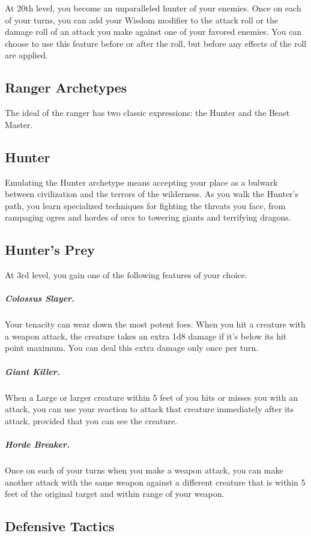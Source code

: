 At 20th level, you become an unparalleled hunter of your enemies. Once on each of your turns, you can add your Wisdom modifier to the attack roll or the damage roll of an attack you make against one of your favored enemies. You can choose to use this feature before or after the roll, but before any effects of the roll are applied.

\subsection{Ranger Archetypes}

The ideal of the ranger has two classic expressions: the Hunter and the Beast Master.

\subsection{Hunter}

Emulating the Hunter archetype means accepting your place as a bulwark between civilization and the terrors of the wilderness. As you walk the Hunter’s path, you learn specialized techniques for fighting the threats you face, from rampaging ogres and hordes of orcs to towering giants and terrifying dragons.

\subsection{Hunter’s Prey}

At 3rd level, you gain one of the following features of your choice.

\subparagraph*{Colossus Slayer.} Your tenacity can wear down the most potent foes. When you hit a creature with a weapon attack, the creature takes an extra 1d8 damage if it’s below its hit point maximum. You can deal this extra damage only once per turn.

\subparagraph*{Giant Killer.} When a Large or larger creature within 5 feet of you hits or misses you with an attack, you can use your reaction to attack that creature immediately after its attack, provided that you can see the creature.

\subparagraph*{Horde Breaker.} Once on each of your turns when you make a weapon attack, you can make another attack with the same weapon against a different creature that is within 5 feet of the original target and within range of your weapon.

\subsection{Defensive Tactics}

